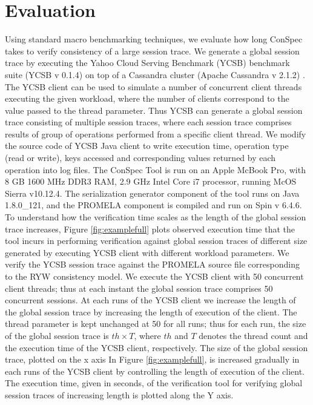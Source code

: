 \documentclass[journal,compsoc]{IEEEtran}
\begin{document}
 \section{Evaluation}\label{sec:eval}
   Using standard macro benchmarking techniques, we evaluate how long ConSpec takes to verify consistency of a large session trace.   We generate a global session trace by executing the Yahoo Cloud Serving Benchmark (YCSB) benchmark suite (YCSB v 0.1.4)  \cite{Cooper:2010:BCS:1807128.1807152}  on top of a Cassandra cluster (Apache Cassandra v 2.1.2)  \cite{Lakshman:2010:CDS:1773912.1773922}.  %
 The YCSB client can be used to simulate a number of concurrent client threads executing the given workload, where the number of clients correspond to the value passed to the thread parameter. Thus YCSB can generate a global session trace consisting of multiple session traces, where each session trace comprises results of group of operations performed from a specific client thread.    We modify the source code of YCSB Java client to write execution time, operation type (read or write), keys accessed and corresponding values returned by each operation into log files. The ConSpec Tool is run on an Apple McBook Pro, with 8 GB 1600 MHz DDR3 RAM,  2.9 GHz Intel Core i7 processor, %
 running McOS Sierra v10.12.4. The serialization generator component of the tool runs on Java 1.8.0\_121, and the PROMELA component is compiled and run on Spin v 6.4.6.  
  To understand how the verification time scales as the length of the global session trace increases, Figure \ref{fig:examplefull} plots observed execution time that the tool incurs in performing verification against global session traces of different size generated by executing YCSB client with different workload parameters.  We verify the YCSB session trace against the PROMELA source file corresponding to the RYW consistency model. 
 We execute the YCSB client with 50 concurrent client threads; thus at each instant the global session trace comprises 50 concurrent sessions.
  At each runs of the YCSB client we increase the length of the global session trace by increasing the length of execution of the client. The thread parameter is kept unchanged at 50 for all runs; thus for each run, the size of the global session trace is $\mathit{th} \times T$,  where $\mathit{th}$ and  $T$ denotes the thread count and the execution time of the YCSB client, respectively. 
  The size of the global session trace, plotted on the x axis In Figure \ref{fig:examplefull},  is increased gradually in each runs of the YCSB client by controlling the length of execution of the client.  The execution time, given in seconds, of the verification tool for verifying global session traces of increasing length is plotted along the Y axis. 
\end{document}
